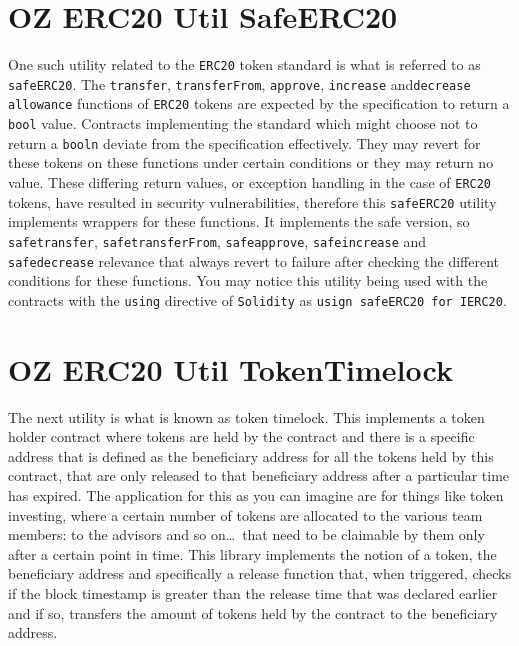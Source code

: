 \section{OZ ERC20 Util SafeERC20}
One such utility related to the \verb|ERC20| token standard is what is referred to as \verb|safeERC20|. The \verb|transfer|, \verb|transferFrom|, \verb|approve|, \verb|increase| and\linebreak\verb|decrease allowance| functions of \verb|ERC20| tokens are expected by the specification to return a \verb|bool| value. Contracts implementing the standard which might choose not to return a \verb|booln| deviate from the specification effectively. They may revert for these tokens on these functions under certain conditions or they may return no value. These differing return values, or exception handling in the case of \verb|ERC20| tokens, have resulted in security vulnerabilities, therefore this \verb|safeERC20| utility implements wrappers for these functions. It implements the safe version, so \verb|safetransfer|, \verb|safetransferFrom|, \verb|safeapprove|, \verb|safeincrease| and \verb|safedecrease| relevance that always revert to failure after checking the different conditions for these functions. You may notice this utility being used with the contracts with the \verb|using| directive of \verb|Solidity| as \verb|usign safeERC20 for IERC20|.

\section{OZ ERC20 Util TokenTimelock}
The next utility is what is known as token timelock. This implements a token holder contract where tokens are held by the contract and there is a specific address that is defined as the beneficiary address for all the tokens held by this contract, that are only released to that beneficiary address after a particular time has expired. The application for this as you can imagine are for things like token investing, where a certain number of tokens are allocated to the various team members: to the advisors and so on\dots\, that need to be claimable by them only after a certain point in time. This library implements the notion of a token, the beneficiary address and specifically a release function that, when triggered, checks if the block timestamp is greater than the release time that was declared earlier and if so, transfers the amount of tokens held by the contract to the beneficiary address.

